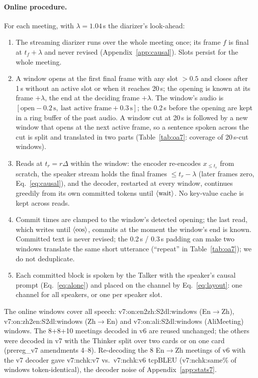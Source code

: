 \paragraph{Online procedure.} For each meeting, with $\lambda=1.04$\,s the diarizer's look-ahead:
\begin{enumerate}\setlength{\itemsep}{0pt}
\item The streaming diarizer runs over the whole meeting once; its frame $f$ is final at $t_f+\lambda$ and never revised
(Appendix~\ref{app:causal}). Slots persist for the whole meeting.
\item A window opens at the first final frame with any slot $>0.5$ and closes after 1\,s without an active slot or when it
reaches 20\,s; the opening is known at its frame $+\lambda$, the end at the deciding frame $+\lambda$. The window's audio is
$[\text{open}-0.2\,\text{s},\ \text{last active frame}+0.3\,\text{s}]$; the 0.2\,s before the opening are kept in a ring
buffer of the past audio. A window cut at 20\,s is followed by a new window that opens at the next active frame, so a
sentence spoken across the cut is split and translated in two parts (Table~\ref{tab:oa7}: coverage of 20\,s-cut windows).
\item Reads at $t_r=r\Delta$ within the window: the encoder re-encodes $x_{\le t_r}$ from scratch, the speaker stream holds
the final frames $\le t_r-\lambda$ (later frames zero, Eq.~\eqref{eq:causal}), and the decoder, restarted at every window,
continues greedily from its own committed tokens until $\langle\mathrm{wait}\rangle$. No key-value cache is kept across reads.
\item Commit times are clamped to the window's detected opening; the last read, which writes until $\langle\mathrm{eos}\rangle$, commits at the
moment the window's end is known. Committed text is never revised; the 0.2\,s / 0.3\,s padding can make two windows
translate the same short utterance (``repeat'' in Table~\ref{tab:oa7}); we do not deduplicate.
\item Each committed block is spoken by the Talker with the speaker's causal prompt (Eq.~\eqref{eq:alone}) and placed on
the channel by Eq.~\eqref{eq:layout}: one channel for all speakers, or one per speaker slot.
\end{enumerate}
The online windows cover all speech: \num{v7:on:en2zh:S2dl:windows} (En$\rightarrow$Zh), \num{v7:on:zh2en:S2dl:windows}
(Zh$\rightarrow$En) and \num{v7:on:ali:S2dl:windows} (AliMeeting) windows. The 8+8+10 meetings decoded in v6 are reused
unchanged; the others were decoded in v7 with the Thinker split over two cards or on one card (prereg\_v7 amendments 4--8).
Re-decoding the 8 En$\rightarrow$Zh meetings of v6 with the v7 decoder gave \num{v7:nchk:v7} vs.\ \num{v7:nchk:v6}
tcpBLEU (\num{v7:nchk:same}\% of windows token-identical), the decoder noise of Appendix~\ref{app:stats7}.

